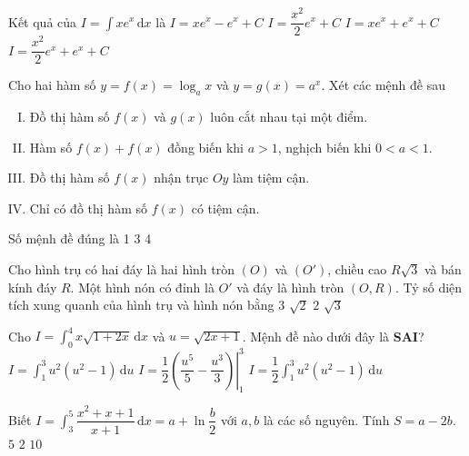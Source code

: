 \begin{ex}%
Kết quả của $I=\displaystyle\int xe^x\mathrm{\, d}x$ là
\choice
{\True $I=xe^x-e^x+C$}
{$I=\dfrac{x^2}{2}e^x+C$}
{$I=xe^x+e^x+C$}
{$I=\dfrac{x^2}{2}e^x+e^x+C$}
\end{ex}

\begin{ex}%
Cho hai hàm số $y=f(x)=\log_a x$ và $y=g(x)=a^x$. Xét các mệnh đề sau
\begin{enumerate}[I.]
\item Đồ thị hàm số $f(x)$ và $g(x)$ luôn cắt nhau tại một điểm.
\item Hàm số $f(x)+f(x)$ đồng biến khi $a>1$, nghịch biến khi $0<a<1$.
\item Đồ thị hàm số $f(x)$ nhận trục $Oy$ làm tiệm cận.
\item Chỉ có đồ thị hàm số $f(x)$ có tiệm cận.
\end{enumerate}
Số mệnh đề đúng là 
\choice
{1}
{}
{3}
{4}
\end{ex}

\begin{ex}%
Cho hình trụ có hai đáy là hai hình tròn $(O)$ và $(O')$, chiều cao $R\sqrt{3}$ và bán kính đáy $R$. Một hình nón có đỉnh là $O'$ và đáy là hình tròn $(O,R)$. Tỷ số diện tích xung quanh của hình trụ và hình nón bằng
\choice
{$3$}
{$\sqrt{2}$}
{$2$}
{\True $\sqrt{3}$}
\end{ex}

\begin{ex}%
Cho $I=\displaystyle\int_0^4 x\sqrt{1+2x}\mathrm{\, d}x$ và $u=\sqrt{2x+1}$. Mệnh đề nào dưới đây là \textbf{SAI}?
{\True $I=\displaystyle\int_1^3 u^2(u^2-1)\mathrm{\, d}u$}
{$I=\dfrac{1}{2}\left.\left(\dfrac{u^5}{5}-\dfrac{u^3}{3}\right)\right|_1^3$}
{$I=\dfrac{1}{2}\displaystyle\int_1^3 u^2(u^2-1)\mathrm{\, d}u$}
\end{ex}

\begin{ex}%
Biết $I=\displaystyle\int_3^5 \dfrac{x^2+x+1}{x+1}\mathrm{\, d}x=a+\ln\dfrac{b}{2}$ với $a,b$ là các số nguyên. Tính $S=a-2b$.
{$5$}
{\True $2$}
{$10$}
\end{ex}

